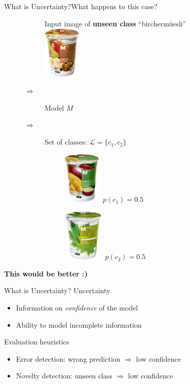 \documentclass{beamer}
\begin{document}
\begin{frame}{What is Uncertainty?}{What happens to this case?}
\begin{figure}[H]
\centering
\begin{subfigure}{0.22\textwidth}
	\centering
	Input image of \textbf{unseen class} ``birchermüesli''\\[.5cm]
	\includegraphics[height=2.5cm]{m-classic-joghurt-birchermueesli}
\end{subfigure}$\Rightarrow$
\begin{subfigure}{0.14\textwidth}
	\centering
	Model $M$
\end{subfigure} $ \Rightarrow$
\begin{subfigure}{0.5\textwidth}
	\centering
	Set of classes:  $\mathcal{L}=\{c_1, c_2\}$\\ [.5cm]
	\begin{subfigure}{0.4\textwidth}
		\centering
		\includegraphics[height=2.5cm]{m-classic-joghurt-apfelmango}
		$p(c_1)=0.5$
	\end{subfigure}
	\begin{subfigure}{0.4\textwidth}
		\centering
		\includegraphics[height=2.5cm]{m-classic-joghurt-ahornsirup-stichfest} 
		$p(c_2)=0.5$
	\end{subfigure}
\end{subfigure}
\end{figure}
\textbf{This would be better :)}
\end{frame}


\begin{frame}{What is Uncertainty?}
Uncertainty
\begin{itemize}
	\item Information on \textit{confidence} of the model
	\item Ability to model incomplete information
\end{itemize}
Evaluation heuristics
\begin{itemize}
	\item Error detection: wrong prediction $\Rightarrow$ low confidence
	\item Novelty detection: unseen class $\Rightarrow$ low confidence
\end{itemize}
\end{frame}
\end{document}
